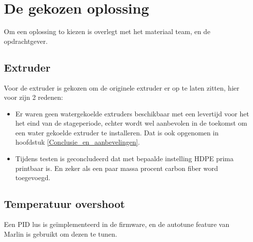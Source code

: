 \chapter{De gekozen oplossing}
\label{De_gekozen_oplossing}

Om een oplossing to kiezen is overlegt met het materiaal team, en de
opdrachtgever.

\section{Extruder}

Voor de extruder is gekozen om de originele extruder er op te laten zitten,
hier voor zijn 2 redenen:

\begin{itemize}
    \item Er waren geen watergekoelde extruders beschikbaar met een levertijd
    voor het het eind van de stageperiode, echter wordt wel aanbevolen in de
    toekomst om een water gekoelde extruder te installeren. Dat is ook
    opgenomen in hoofdstuk \ref{Conclusie_en_aanbevelingen}.
    \item Tijdens testen is geconcludeerd dat met bepaalde instelling HDPE
    prima printbaar is. En zeker als een paar massa procent carbon fiber word
    toegevoegd.
\end{itemize}

\section{Temperatuur overshoot}

Een PID lus is geïmplementeerd in de firmware, en de autotune feature van
Marlin is gebruikt om dezen te tunen.

